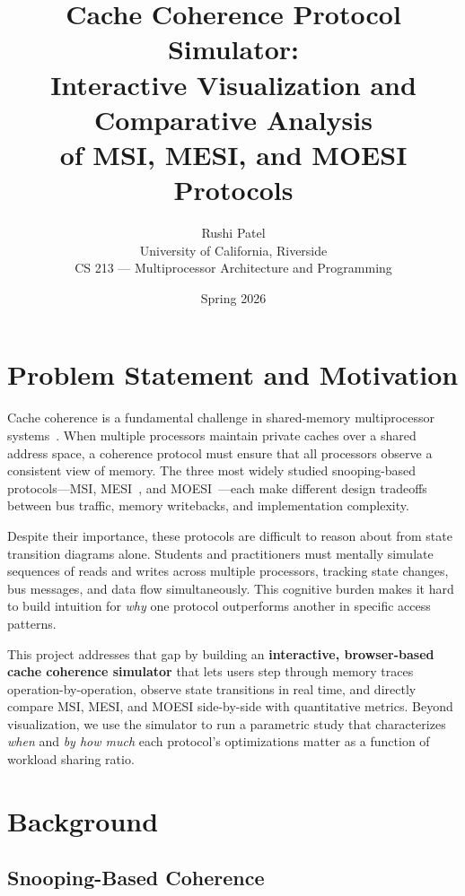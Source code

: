 \documentclass[10pt,twocolumn]{article}
\title{\textbf{Cache Coherence Protocol Simulator:\\Interactive Visualization and Comparative Analysis\\of MSI, MESI, and MOESI Protocols}}
\author{Rushi Patel\\University of California, Riverside\\CS 213 --- Multiprocessor Architecture and Programming}
\date{Spring 2026}
\begin{document}
\maketitle

\section{Problem Statement and Motivation}

Cache coherence is a fundamental challenge in shared-memory multiprocessor systems~\cite{sorin2011primer}. When multiple processors maintain private caches over a shared address space, a coherence protocol must ensure that all processors observe a consistent view of memory. The three most widely studied snooping-based protocols---MSI, MESI~\cite{papamarcos1984mesi}, and MOESI~\cite{sweazey1986moesi}---each make different design tradeoffs between bus traffic, memory writebacks, and implementation complexity.

Despite their importance, these protocols are difficult to reason about from state transition diagrams alone. Students and practitioners must mentally simulate sequences of reads and writes across multiple processors, tracking state changes, bus messages, and data flow simultaneously. This cognitive burden makes it hard to build intuition for \emph{why} one protocol outperforms another in specific access patterns.

This project addresses that gap by building an \textbf{interactive, browser-based cache coherence simulator} that lets users step through memory traces operation-by-operation, observe state transitions in real time, and directly compare MSI, MESI, and MOESI side-by-side with quantitative metrics. Beyond visualization, we use the simulator to run a parametric study that characterizes \emph{when} and \emph{by how much} each protocol's optimizations matter as a function of workload sharing ratio.

\section{Background}

\subsection{Snooping-Based Coherence}
\end{document}

